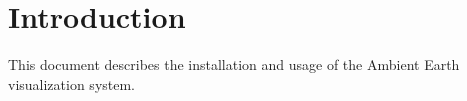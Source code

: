 \chapter{\label{cpt:usage:introduction}Introduction}

This document describes the installation and usage of the Ambient Earth
visualization system.
